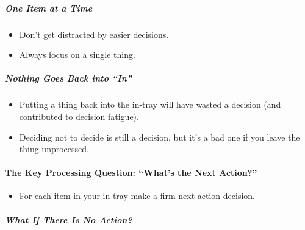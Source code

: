 \documentclass{article}
\begin{document}
\subparagraph{One Item at a Time}

\begin{itemize}
  \item Don't get distracted by easier decisions.
  \item Always focus on a single thing.
\end{itemize}

\subparagraph{Nothing Goes Back into ``In''}

\begin{itemize}
  \item Putting a thing back into the in-tray will have wasted a decision (and contributed to decision fatigue).
  \item Deciding not to decide is still a decision, but it's a bad one if you leave the thing unprocessed.
\end{itemize}

\paragraph{The Key Processing Question: ``What's the Next Action?''}

\begin{itemize}
  \item For each item in your in-tray make a firm next-action decision.
\end{itemize}

\subparagraph{What If There Is No Action?}
\end{document}
